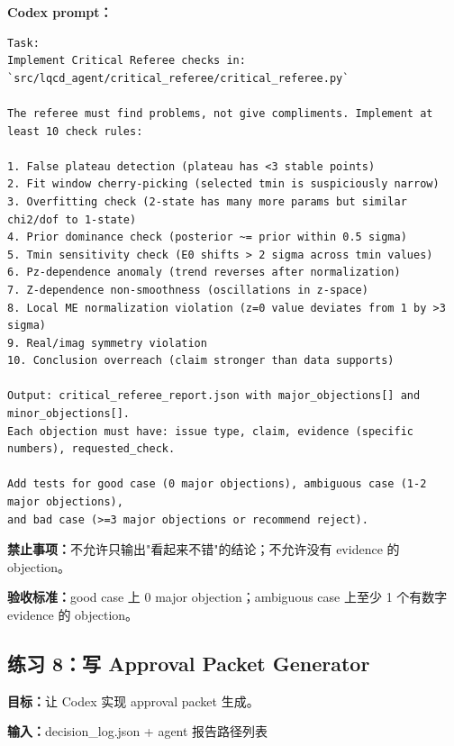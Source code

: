 \documentclass[11pt,a4paper,fontset=fandol]{ctexart}
\begin{document}
\textbf{Codex prompt：}
\begin{lstlisting}
Task:
Implement Critical Referee checks in:
`src/lqcd_agent/critical_referee/critical_referee.py`

The referee must find problems, not give compliments. Implement at least 10 check rules:

1. False plateau detection (plateau has <3 stable points)
2. Fit window cherry-picking (selected tmin is suspiciously narrow)
3. Overfitting check (2-state has many more params but similar chi2/dof to 1-state)
4. Prior dominance check (posterior ~= prior within 0.5 sigma)
5. Tmin sensitivity check (E0 shifts > 2 sigma across tmin values)
6. Pz-dependence anomaly (trend reverses after normalization)
7. Z-dependence non-smoothness (oscillations in z-space)
8. Local ME normalization violation (z=0 value deviates from 1 by >3 sigma)
9. Real/imag symmetry violation
10. Conclusion overreach (claim stronger than data supports)

Output: critical_referee_report.json with major_objections[] and minor_objections[].
Each objection must have: issue type, claim, evidence (specific numbers), requested_check.

Add tests for good case (0 major objections), ambiguous case (1-2 major objections), 
and bad case (>=3 major objections or recommend reject).
\end{lstlisting}

\textbf{禁止事项：}不允许只输出"看起来不错"的结论；不允许没有 evidence 的 objection。

\textbf{验收标准：}good case 上 0 major objection；ambiguous case 上至少 1 个有数字 evidence 的 objection。

\subsection{练习 8：写 Approval Packet Generator}

\textbf{目标：}让 Codex 实现 approval packet 生成。

\textbf{输入：}decision\_log.json + agent 报告路径列表
\end{document}
